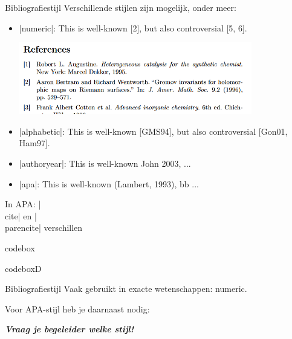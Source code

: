 
\begin{frame}{Bibliografiestijl}
	Verschillende stijlen zijn mogelijk, onder meer:
	
	\begin{itemize}
		\item \hll|numeric|: This is well-known [2], but also controversial [5, 6].\par
		\includegraphics[width=0.8\textwidth]{assets/biblatexStyles/numericReferences.png}
		
		\item\hll|alphabetic|: This is well-known [GMS94], but also controversial [Gon01, Ham97].
		\item\hll|authoryear|: This is well-known John 2003, ...
		\item\hll|apa|: This is well-known (Lambert, 1993), bb ...
	\end{itemize}
	In APA: \hll|\\cite| en \hll|\\parencite| verschillen
\end{frame}


\begin{saveblock}{codebox}
	\begin{highlightblock}
		\usepackage[style=numeric]{biblatex}
	\end{highlightblock}
\end{saveblock}


\begin{saveblock}{codeboxD}%
	\begin{highlightblock}
	\end{highlightblock}
\end{saveblock}

\begin{frame}{Bibliografiestijl}
	Vaak gebruikt in exacte wetenschappen: numeric.
	
	\medskip
	Voor APA-stijl heb je daarnaast nodig:

	\bigskip
	
	{\large\itshape\bfseries Vraag je begeleider welke stijl!}
\end{frame}
